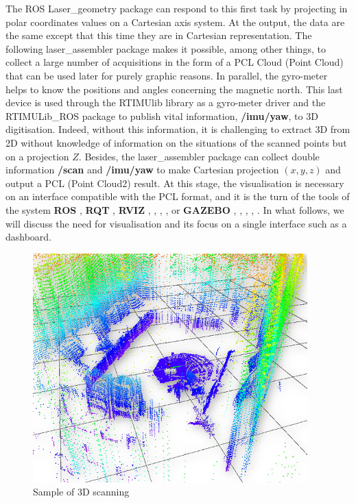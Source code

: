 \documentclass[Afour,sageh,times]{sagej}
\begin{document}
The ROS Laser\_geometry package can respond to this first task by projecting in polar coordinates values on a Cartesian axis system. At the output, the data are the same except that this time they are in Cartesian representation. The following laser\_assembler package makes it possible, among other things, to collect a large number of acquisitions in the form of a PCL Cloud (Point Cloud) that can be used later for purely graphic reasons.
In parallel, the gyro-meter helps to know the positions and angles concerning the magnetic north. This last device is used through the RTIMUlib library as a gyro-meter driver and the RTIMULib\_ROS package to publish vital information, \textbf{/imu/yaw}, to 3D digitisation.
Indeed, without this information, it is challenging to extract 3D from 2D without knowledge of information on the situations of the scanned points but on a projection $Z$.
Besides, the laser\_assembler package can collect double information \textbf{/scan} and \textbf{/imu/yaw} to make Cartesian projection $(x,y,z)$ and output a PCL (Point Cloud2) result. At this stage, the visualisation is necessary on an interface compatible with the PCL format, and it is the turn of the tools of the system \textbf{ROS} \citep{Quigley2009}, \textbf{RQT} \citep{Kumar2016}, \textbf{RVIZ} \citep{Hernandez-Mendez2018}, \citep{DaveHershbergerDavidGossow2009}, \citep{Omara2016}, \citep{Shen2018}, \citep{Arvind2016} or \textbf{GAZEBO} \citep{Meyer2012}, \citep{Joseph2015}, \citep{Zhang2015}, \citep{Afanasyev2015}, \citep{Rosa2015}. In what follows, we will discuss the need for visualisation and its focus on a single interface such as a dashboard.

\begin{figure}
    \centering
    \includegraphics[scale=20]{scan1.png}
    \caption{Sample of 3D scanning}
    \label{fig:3dscan}
\end{figure}
\end{document}
